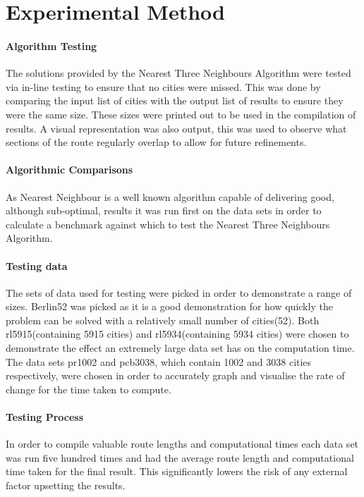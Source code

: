 \documentclass[conference,backref=page]{acmsiggraph}
\begin{document}
\section{Experimental Method} 

\paragraph{Algorithm Testing}
The solutions provided by the Nearest Three Neighbours Algorithm were tested via in-line testing to ensure that no cities were missed. This was done by comparing the input list of cities with the output list of results to ensure they were the same size. These sizes were printed out to be used in the compilation of results. A visual representation was also output, this was used to observe what sections of the route regularly overlap to allow for future refinements.

\paragraph{Algorithmic Comparisons}
As Nearest Neighbour is a well known algorithm capable of delivering good, although sub-optimal, results it was run first on the data sets in order to calculate a benchmark against which to test the Nearest Three Neighbours Algorithm.

\paragraph{Testing data} 
The sets of data used for testing were picked in order to demonstrate a range of sizes. Berlin52 was picked as it is a good demonstration for how quickly the problem can be solved with a relatively small number of cities(52). Both rl5915(containing 5915 cities) and rl5934(containing 5934 cities) were chosen to demonstrate the effect an extremely large data set has on the computation time. The data sets pr1002 and pcb3038, which contain 1002 and 3038 cities respectively, were chosen in order to accurately graph and visualise the rate of change for the time taken to compute.

\paragraph{Testing Process}
In order to compile valuable route lengths and computational times each data set was run five hundred times and had the average route length and computational time taken for the final result. This significantly lowers the risk of any external factor upsetting the results.
\end{document}
